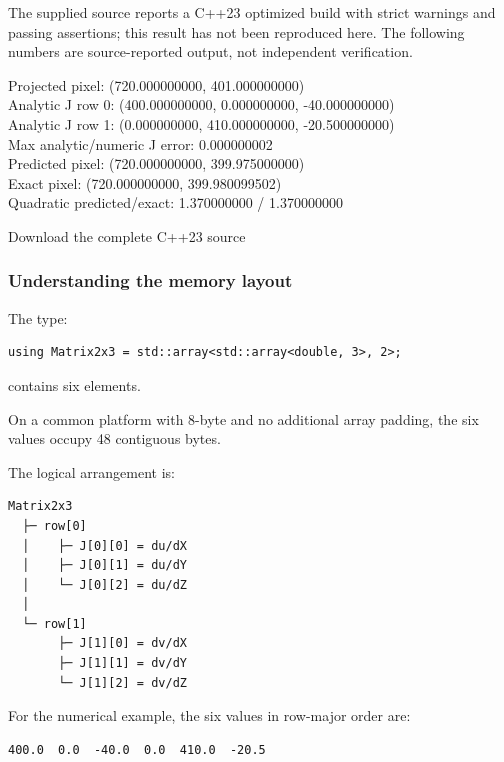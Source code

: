 The supplied source reports a C++23 optimized build with strict warnings and passing assertions; this result has not been reproduced here. The following numbers are source-reported output, not independent verification.

Projected pixel: (720.000000000, 401.000000000)\\
Analytic J row 0: (400.000000000, 0.000000000, -40.000000000)\\
Analytic J row 1: (0.000000000, 410.000000000, -20.500000000)\\
Max analytic/numeric J error: 0.000000002\\
Predicted pixel: (720.000000000, 399.975000000)\\
Exact pixel: (720.000000000, 399.980099502)\\
Quadratic predicted/exact: 1.370000000 / 1.370000000

Download the complete C++23 source

\subsubsection{Understanding the memory layout}\label{02-foundations-ii-ch021-understanding-the-memory-layout}

\hypertarget{02-foundations-ii-ch021-understanding-the-memory-layout}{}

The type:

\begin{verbatim}
using Matrix2x3 = std::array<std::array<double, 3>, 2>;
\end{verbatim}

contains six  elements.

On a common platform with 8-byte  and no additional array padding, the six values occupy 48 contiguous bytes.

The logical arrangement is:

\begin{verbatim}
Matrix2x3
  ├─ row[0]
  │    ├─ J[0][0] = du/dX
  │    ├─ J[0][1] = du/dY
  │    └─ J[0][2] = du/dZ
  │
  └─ row[1]
       ├─ J[1][0] = dv/dX
       ├─ J[1][1] = dv/dY
       └─ J[1][2] = dv/dZ
\end{verbatim}

For the numerical example, the six values in row-major order are:

\begin{verbatim}
400.0  0.0  -40.0  0.0  410.0  -20.5
\end{verbatim}

